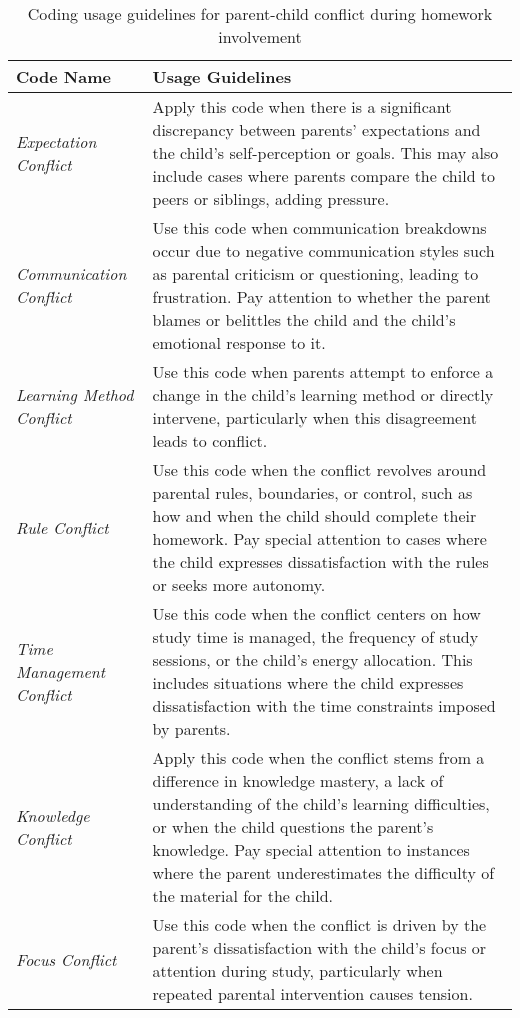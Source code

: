 \begin{table}[h]
\centering
\footnotesize
\caption{Coding usage guidelines for parent-child conflict during homework involvement}
\label{appen:tab:conflict}
\begin{tabular}
{p{} p{}}

\toprule
\textbf{Code Name} & \textbf{Usage Guidelines} \\ 
\midrule

\textit{Expectation \newline Conflict} & Apply this code when there is a significant discrepancy between parents' expectations and the child’s self-perception or goals. This may also include cases where parents compare the child to peers or siblings, adding pressure. \\

\hline
\textit{Communication Conflict} & Use this code when communication breakdowns occur due to negative communication styles such as parental criticism or questioning, leading to frustration. Pay attention to whether the parent blames or belittles the child and the child’s emotional response to it. \\

\hline
\textit{Learning Method Conflict} & Use this code when parents attempt to enforce a change in the child’s learning method or directly intervene, particularly when this disagreement leads to conflict. \\

\hline
\textit{Rule Conflict} & Use this code when the conflict revolves around parental rules, boundaries, or control, such as how and when the child should complete their homework. Pay special attention to cases where the child expresses dissatisfaction with the rules or seeks more autonomy. \\

\hline
\textit{Time \newline Management Conflict} & Use this code when the conflict centers on how study time is managed, the frequency of study sessions, or the child’s energy allocation. This includes situations where the child expresses dissatisfaction with the time constraints imposed by parents. \\

\hline
\textit{Knowledge \newline Conflict} & Apply this code when the conflict stems from a difference in knowledge mastery, a lack of understanding of the child’s learning difficulties, or when the child questions the parent’s knowledge. Pay special attention to instances where the parent underestimates the difficulty of the material for the child. \\

\hline
\textit{Focus Conflict} & Use this code when the conflict is driven by the parent’s dissatisfaction with the child’s focus or attention during study, particularly when repeated parental intervention causes tension. \\

\bottomrule
\end{tabular}
\end{table}

